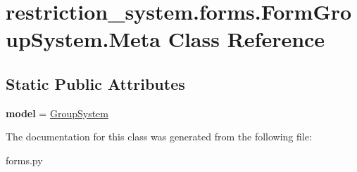 \hypertarget{classrestriction__system_1_1forms_1_1FormGroupSystem_1_1Meta}{}\section{restriction\+\_\+system.\+forms.\+Form\+Group\+System.\+Meta Class Reference}
\label{classrestriction__system_1_1forms_1_1FormGroupSystem_1_1Meta}
\subsection*{Static Public Attributes}
\begin{DoxyCompactItemize}
\item 
\hypertarget{classrestriction__system_1_1forms_1_1FormGroupSystem_1_1Meta_a1bae8449defefb0512801e712241dbdf}{}{\bfseries model} = \hyperlink{classrestriction__system_1_1models_1_1GroupSystem}{Group\+System}\label{classrestriction__system_1_1forms_1_1FormGroupSystem_1_1Meta_a1bae8449defefb0512801e712241dbdf}

\end{DoxyCompactItemize}


The documentation for this class was generated from the following file\+:\begin{DoxyCompactItemize}
\item 
forms.\+py\end{DoxyCompactItemize}
